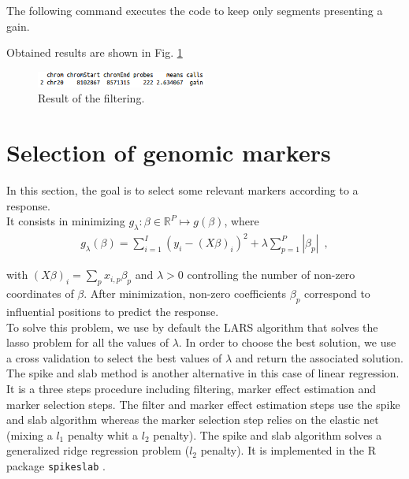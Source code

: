 \documentclass[a4paper,10pt]{article}
\begin{document}
			The following command executes the code to keep only segments presenting a gain.
\begin{Schunk}
\end{Schunk}
			
			Obtained results are shown in Fig. \ref{filterplot}
			\begin{figure}[!h]
				\centering
				\includegraphics[width=0.5\textwidth]{fig/segapresfiltre2}
				\caption{Result of the filtering.}
        \label{filterplot}
			\end{figure}
	
			
\section{Selection of genomic markers}
	\label{sec:select}
	
	
	In this section, the goal is to select some relevant markers according to a response.\\
	
It consists in minimizing $g_{\lambda}:\beta \in {}^P\mapsto g(\beta)$, where
    \begin{align*}
      g_{\lambda}(\beta) = \sum\limits_{i=1}^I (y_i-(X\beta)_i)^2+\lambda
      \sum\limits_{p=1}^P |\beta_p|  \enspace,
    \end{align*}
      
with $(X\beta)_{i}=\sum_p x_{i,p}\beta_p$ and $\lambda>0$ controlling the number of non-zero coordinates of $\beta$.
%
After minimization, non-zero coefficients $\beta_p$ correspond to influential positions to predict the response. \\
	
	To solve this problem, we use by default the LARS algorithm \cite{lars} that solves the lasso problem for all the values of $\lambda$. In order to choose the best solution, we use a cross validation to select the best values of $\lambda$ and return the associated solution.\\
  
  The spike and slab method \cite{spikeslab1}\cite{spikeslab2} is another alternative in this case of linear regression. It is a three steps procedure including filtering, marker effect estimation and marker selection steps. The filter and marker effect estimation steps use the spike and slab algorithm whereas the marker selection step relies on the elastic net (mixing a $l_1$ penalty whit a $l_2$ penalty). The spike and slab algorithm solves a generalized ridge regression problem ($l_2$ penalty). It is implemented in the R package \texttt{spikeslab} \cite{spikeslabR}. 
	
\end{document}
